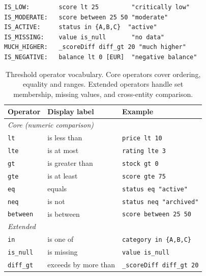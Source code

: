 \documentclass[11pt,a4paper]{article}
\begin{document}
\begin{lstlisting}
IS_LOW:        score lt 25         "critically low"
IS_MODERATE:   score between 25 50 "moderate"
IS_ACTIVE:     status in {A,B,C}  "active"
IS_MISSING:    value is_null       "no data"
MUCH_HIGHER:   _scoreDiff diff_gt 20 "much higher"
IS_NEGATIVE:   balance lt 0 [EUR]  "negative balance"
\end{lstlisting}

\begin{table}[h]
\centering
\small
\begin{tabular}{lll}
\toprule
\textbf{Operator} & \textbf{Display label} & \textbf{Example} \\
\midrule
\multicolumn{3}{l}{\textit{Core (numeric comparison)}} \\
\texttt{lt} & is less than & \texttt{price lt 10} \\
\texttt{lte} & is at most & \texttt{rating lte 3} \\
\texttt{gt} & is greater than & \texttt{stock gt 0} \\
\texttt{gte} & is at least & \texttt{score gte 75} \\
\texttt{eq} & equals & \texttt{status eq "active"} \\
\texttt{neq} & is not & \texttt{status neq "archived"} \\
\texttt{between} & is between & \texttt{score between 25 50} \\
\midrule
\multicolumn{3}{l}{\textit{Extended}} \\
\texttt{in} & is one of & \texttt{category in \{A,B,C\}} \\
\texttt{is\_null} & is missing & \texttt{value is\_null} \\
\texttt{diff\_gt} & exceeds by more than & \texttt{\_scoreDiff diff\_gt 20} \\
\bottomrule
\end{tabular}
\caption{Threshold operator vocabulary. Core operators cover ordering, equality and ranges. Extended operators handle set membership, missing values, and cross-entity comparison.}
\label{tab:operators}
\end{table}
\end{document}
